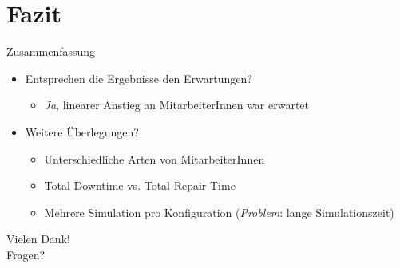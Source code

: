 \documentclass{beamer}
\begin{document}
    \section{Fazit}
    \begin{frame}{Zusammenfassung}
        \begin{itemize}
            \item Entsprechen die Ergebnisse den Erwartungen?\\
            \begin{itemize}
                \item<2-> \textit{Ja}, linearer Anstieg an MitarbeiterInnen war erwartet
            \end{itemize}
            \item Weitere Überlegungen?\\
            \begin{itemize}
                \item<3-> Unterschiedliche Arten von MitarbeiterInnen
                \item<4-> Total Downtime vs. Total Repair Time
                \item<5-> Mehrere Simulation pro Konfiguration (\textit{Problem}: lange Simulationszeit)
            \end{itemize}
        \end{itemize}
    \end{frame}

    \begin{frame}[standout]
        Vielen Dank!\\
        Fragen?
    \end{frame}
\end{document}
